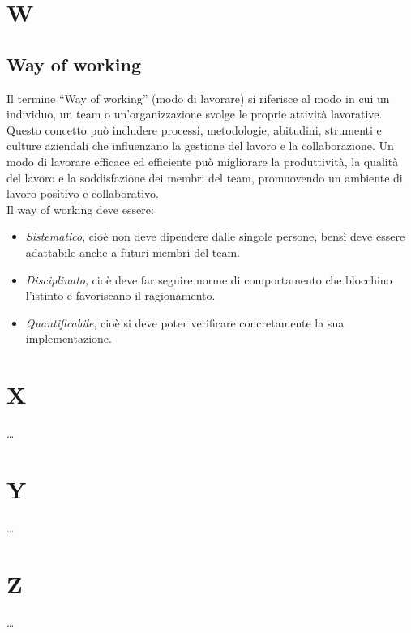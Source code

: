 
\section*{W}

\subsection*{Way of working}
\label{sec:way_of_working}
Il termine “Way of working” (modo di lavorare) si riferisce al modo in cui un individuo, un team o un’organizzazione svolge le proprie attività lavorative. 
Questo concetto può includere processi, metodologie, abitudini, strumenti e culture aziendali che influenzano la gestione del lavoro e la collaborazione. 
Un modo di lavorare efficace ed efficiente può migliorare la produttività, la qualità del lavoro e la soddisfazione dei membri del team, promuovendo un 
ambiente di lavoro positivo e collaborativo. \\
Il way of working deve essere:
\begin{itemize}
    \item \emph{Sistematico}, cioè non deve dipendere dalle singole persone, bensì deve essere adattabile anche a futuri membri del team.
    \item \emph{Disciplinato}, cioè deve far seguire norme di comportamento che blocchino l'istinto e favoriscano il ragionamento.
    \item \emph{Quantificabile}, cioè si deve poter verificare concretamente la sua implementazione.
\end{itemize}

\newpage



\section*{X}

\dots

\newpage



\section*{Y}

\dots

\newpage



\section*{Z}

\dots
